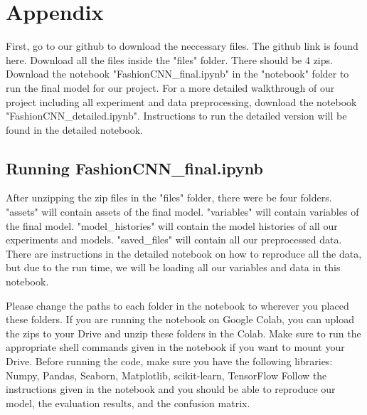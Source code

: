 \documentclass[twoside,twocolumn,9pt]{article}
\renewcommand{\refname}{Notes and references}
\begin{document}
\section{Appendix}

First, go to our github to download the neccessary files. The github link is found here\cite{github}. Download all the files inside the "files" folder. There should be 4 zips. Download the notebook  "FashionCNN\_final.ipynb" in the "notebook" folder to run the final model for our project. For a more detailed walkthrough of our project including all experiment and data preprocessing, download the notebook "FashionCNN\_detailed.ipynb". Instructions to run the detailed version will be found in the detailed notebook.

\subsection{Running FashionCNN\_final.ipynb}
After unzipping the zip files in the "files" folder, there were be four folders. "assets" will contain assets of the final model. "variables" will contain variables of the final model. "model\_histories" will contain the model histories of all our experiments and models. "saved\_files" will contain all our preprocessed data. There are instructions in the detailed notebook on how to reproduce all the data, but due to the run time, we will be loading all our variables and data in this notebook. 

\noindent Please change the paths to each folder in the notebook to wherever you placed these folders. If you are running the notebook on Google Colab, you can upload the zips to your Drive and unzip these folders in the Colab. Make sure to run the appropriate shell commands given in the notebook if you want to mount your Drive. Before running the code, make sure you have the following libraries: Numpy, Pandas, Seaborn, Matplotlib, scikit-learn, TensorFlow
Follow the instructions given in the notebook and you should be able to reproduce our model, the evaluation results, and the confusion matrix. 






\end{document}
